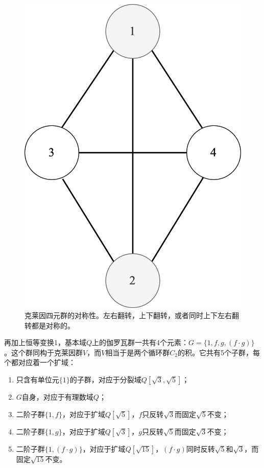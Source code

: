 \documentclass[b5paper]{ctexart}
\begin{document}
\begin{figure}[htbp]
\centering
\includegraphics[scale=0.4]{img/K4}
\caption{克莱因四元群的对称性。左右翻转，上下翻转，或者同时上下左右翻转都是对称的。}
\label{fig:Klein-four-group}
\end{figure}

再加上恒等变换1，基本域$Q$上的伽罗瓦群一共有4个元素：$G = \{1, f, g, (f \cdot g)\}$。这个群同构于克莱因群$V$，而$V$相当于是两个循环群$C_2$的积。它共有5个子群，每个都对应着一个扩域：

\begin{enumerate}
\item 只含有单位元$\{1\}$的子群，对应于分裂域$Q[\sqrt{3}, \sqrt{5}]$；
\item $G$自身，对应于有理数域$Q$；
\item 二阶子群$\{1, f\}$，对应于扩域$Q[\sqrt{5}]$，$f$只反转$\sqrt{3}$而固定$\sqrt{5}$不变；
\item 二阶子群$\{1, g\}$，对应于扩域$Q[\sqrt{3}]$，$g$只反转$\sqrt{5}$而固定$\sqrt{3}$不变；
\item 二阶子群$\{1, (f \cdot g)\}$，对应于扩域$Q[\sqrt{15}]$，$(f \cdot g)$同时反转$\sqrt{5}$和$\sqrt{3}$，而固定$\sqrt{15}$不变。
\end{enumerate}
\end{document}
